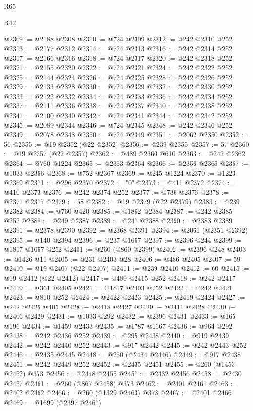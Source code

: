 \begin{lexlean}{R65}
\begin{lexlean}{R42}
\begin{coremodule}
{{{{{{{{{{{{{{{{{{{{{{{{{{{{{{{{{{{{{{{{{{{{{{{{{{{{{{{{{{{{{{{{{{{{{{{{{{{{{{{{{{{{{{{{{{{{{{{{{{{{{{{{{{{{{{{{{{{{{{{{{{{{{{{{{{{{{{{{{{{{{{{{{{{{{{{{{{{{{{{{{{{{{{{{{{{{{{{{{{{{{{{{@2309 := @2188 @2308
@2310 := @724 @2309
@2312 := @242 @2310 @252
@2313 := @2177 @2312
@2314 := @724 @2313
@2316 := @242 @2314 @252
@2317 := @2166 @2316
@2318 := @724 @2317
@2320 := @242 @2318 @252
@2321 := @2155 @2320
@2322 := @724 @2321
@2324 := @242 @2322 @252
@2325 := @2144 @2324
@2326 := @724 @2325
@2328 := @242 @2326 @252
@2329 := @2133 @2328
@2330 := @724 @2329
@2332 := @242 @2330 @252
@2333 := @2122 @2332
@2334 := @724 @2333
@2336 := @242 @2334 @252
@2337 := @2111 @2336
@2338 := @724 @2337
@2340 := @242 @2338 @252
@2341 := @2100 @2340
@2342 := @724 @2341
@2344 := @242 @2342 @252
@2345 := @2089 @2344
@2346 := @724 @2345
@2348 := @242 @2346 @252
@2349 := @2078 @2348
@2350 := @724 @2349
@2351 := @2062 @2350
@2352 := 56
@2355 := @19 @2352 (@22 @2352)
@2356 := @239 @2355
@2357 := 57
@2360 := @19 @2357 (@22 @2357)
@2362 := @489 @2360 @610
@2363 := @242 @2362
@2364 := @760 @1224
@2365 := @2363 @2364
@2366 := @2356 @2365
@2367 := @1033 @2366
@2368 := @752 @2367
@2369 := @245 @1224
@2370 := @1223 @2369
@2371 := @296 @2370
@2372 := "0"
@2373 := @411 @2372
@2374 := @410 @2373
@2376 := @242 @2374 @252
@2377 := @736 @2376
@2378 := @2371 @2377
@2379 := 58
@2382 := @19 @2379 (@22 @2379)
@2383 := @239 @2382
@2384 := @760 @420
@2385 := @1862 @2384
@2387 := @242 @2385 @252
@2388 := @249 @2387
@2389 := @247 @2388
@2390 := @2383 @2389
@2391 := @2378 @2390
@2392 := @2368 @2391
@2394 := @2061 (@2351 @2392)
@2395 := @140 @2394
@2396 := @237 @1667
@2397 := @2396 @244
@2399 := @1817 @1667 @252
@2401 := @260 (@860 @2399)
@2402 := @2396 @248
@2403 := @1426 @11
@2405 := @231 @2403 @28
@2406 := @486 @2405
@2407 := 59
@2410 := @19 @2407 (@22 @2407)
@2411 := @239 @2410
@2412 := 60
@2415 := @19 @2412 (@22 @2412)
@2417 := @489 @2415 @252
@2418 := @242 @2417
@2419 := @361 @2405
@2421 := @1817 @2403 @252
@2422 := @242 @2421
@2423 := @810 @252
@2424 := @2422 @2423
@2425 := @2419 @2424
@2427 := @242 @2425 @405
@2428 := @2418 @2427
@2429 := @2411 @2428
@2430 := @2406 @2429
@2431 := @1033 @292
@2432 := @2396 @2431
@2433 := @165 @196
@2434 := @1459 @2433
@2435 := @1787 @1667
@2436 := @964 @292
@2438 := @242 @2436 @252
@2439 := @295 @2438
@2440 := @919 @2439
@2442 := @242 @2440 @252
@2443 := @917 @2442
@2445 := @242 @2443 @252
@2446 := @2435 @2445
@2448 := @260 (@2434 @2446)
@2449 := @917 @2438
@2451 := @242 @2449 @252
@2452 := @2435 @2451
@2455 := @260 (@1453 @2452) @373
@2456 := @2448 @2455
@2457 := @2432 @2456
@2458 := @2430 @2457
@2461 := @260 (@867 @2458) @373
@2462 := @2401 @2461
@2463 := @2402 @2462
@2466 := @260 (@1329 @2463) @373
@2467 := @2401 @2466
@2469 := @1699 (@2397 @2467)
}}}}}}}}}}}}}}}}}}}}}}}}}}}}}}}}}}}}}}}}}}}}}}}}}}}}}}}}}}}}}}}}}}}}}}}}}}}}}}}}}}}}}}}}}}}}}}}}}}}}}}}}}}}}}}}}}}}}}}}}}}}}}}}}}}}}}}}}}}}}}}}}}}}}}}}}}}}}}}}}}}}}}}}}}}}}}}}}}}}}}}}}
\end{coremodule}
\end{lexlean}
\end{lexlean}
